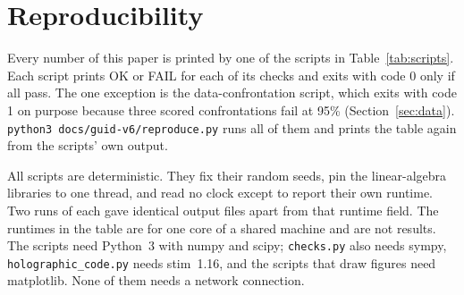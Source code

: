 \section{Reproducibility}\label{app:repro}

Every number of this paper is printed by one of the scripts in Table~\ref{tab:scripts}. Each script prints OK or FAIL for each of its
checks and exits with code 0 only if all pass. The one exception is the data-confrontation script, which exits with code 1 on purpose
because three scored confrontations fail at 95\% (Section~\ref{sec:data}). \texttt{python3 docs/guid-v6/reproduce.py} runs all of them and
prints the table again from the scripts' own output.

All scripts are deterministic. They fix their random seeds, pin the linear-algebra libraries to one thread, and read no clock except to
report their own runtime. Two runs of each gave identical output files apart from that runtime field. The runtimes in the table are for
one core of a shared machine and are not results. The scripts need Python~3 with numpy and scipy; \texttt{checks.py} also needs sympy,
\texttt{holographic\_code.py} needs stim~1.16, and the scripts that draw figures need matplotlib. None of them needs a network connection.

